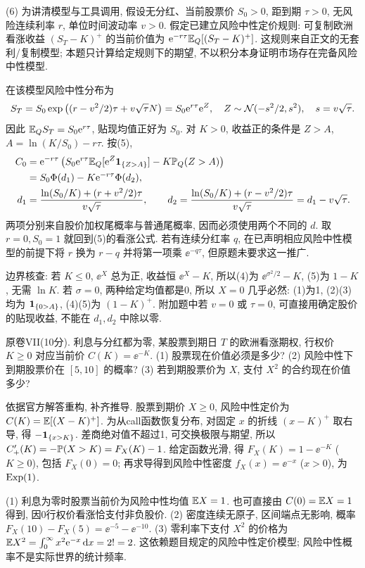 \begin{solution}
(6)\label{sol:flp-VI-6} 为讲清模型与工具调用, 假设无分红、当前股票价 $S_0>0$, 距到期 $\tau>0$, 无风险连续利率 $r$, 单位时间波动率 $v>0$. 假定已建立风险中性定价规则: 可复制欧洲看涨收益 $(S_T-K)^+$ 的当前价值为 $\mathrm e^{-r\tau}\mathbb E_Q[(S_T-K)^+]$. 这规则来自正文的无套利/复制模型; 本题只计算给定规则下的期望, 不以积分本身证明市场存在完备风险中性模型.

在该模型风险中性分布为
\[S_T=S_0\exp\left((r-v^2/2)\tau+v\sqrt\tau N\right)
=S_0\mathrm e^{r\tau}\mathrm e^Z,\quad
Z\sim\mathcal N(-s^2/2,s^2),\quad s=v\sqrt\tau.\]
因此 $\mathbb E_Q S_T=S_0\mathrm e^{r\tau}$, 贴现均值正好为 $S_0$. 对 $K>0$, 收益正的条件是 $Z>A$, $A=\ln(K/S_0)-r\tau$. 按(5),
\begin{align*}
C_0&=\mathrm e^{-r\tau}\left(S_0\mathrm e^{r\tau}\mathbb E_Q[\mathrm e^Z\mathbf 1_{\{Z>A\}}]
-K\mathbb P_Q(Z>A)\right)\\
&=S_0\Phi(d_1)-K\mathrm e^{-r\tau}\Phi(d_2),\\
d_1&=\frac{\ln(S_0/K)+(r+v^2/2)\tau}{v\sqrt\tau},\qquad
 d_2=\frac{\ln(S_0/K)+(r-v^2/2)\tau}{v\sqrt\tau}=d_1-v\sqrt\tau.
\end{align*}
两项分别来自股价加权尾概率与普通尾概率, 因而必须使用两个不同的 $d$. 取 $r=0,S_0=1$ 就回到(5)的看涨公式. 若有连续分红率 $q$, 在已声明相应风险中性模型的前提下将 $r$ 换为 $r-q$ 并将第一项乘 $\ee^{-q\tau}$, 但原题未要求这一推广.

边界核查: 若 $K\leq0$, $\ee^X$ 总为正, 收益恒 $\ee^X-K$, 所以(4)为 $\ee^{\sigma^2/2}-K$, (5)为 $1-K$, 无需 $\ln K$. 若 $\sigma=0$, 两种给定均值都是0, 所以 $X=0$ 几乎必然: (1)为1, (2)(3)均为 $\mathbf 1_{\{0>A\}}$, (4)(5)为 $(1-K)^+$. 附加题中若 $v=0$ 或 $\tau=0$, 可直接用确定股价的贴现收益, 不能在 $d_1,d_2$ 中除以零.
\end{solution}

\begin{exercise}\label{ex:flp-VII}
原卷VII(10分). 利息与分红都为零, 某股票到期日 $T$ 的欧洲看涨期权, 行权价 $K\geq0$ 对应当前价 $C(K)=\ee^{-K}$. (1) 股票现在价值必须是多少? (2) 风险中性下到期股票价在 $[5,10]$ 的概率? (3) 若到期股票价为 $X$, 支付 $X^2$ 的合约现在价值多少?
\end{exercise}
\begin{solution}
依据官方解答重构, 补齐推导. 股票到期价 $X\geq0$, 风险中性定价为 $C(K)=\mathbb E[(X-K)^+]$. 为从call函数恢复分布, 对固定 $x$ 的折线 $(x-K)^+$ 取右导, 得 $-\mathbf 1_{\{x>K\}}$. 差商绝对值不超过1, 可交换极限与期望, 所以 $C'_+(K)=-\mathbb P(X>K)=F_X(K)-1$. 给定函数光滑, 得 $F_X(K)=1-\ee^{-K}$ ($K\geq0$), 包括 $F_X(0)=0$; 再求导得到风险中性密度 $f_X(x)=\ee^{-x}$ ($x>0$), 为 $\operatorname{Exp}(1)$.

(1)\label{sol:flp-VII-1} 利息为零时股票当前价为风险中性均值 $\mathbb E X=1$. 也可直接由 $C(0)=\mathbb E X=1$ 得到, 因0行权价看涨恰支付非负股价.
(2)\label{sol:flp-VII-2} 密度连续无原子, 区间端点无影响, 概率 $F_X(10)-F_X(5)=\ee^{-5}-\ee^{-10}$.
(3)\label{sol:flp-VII-3} 零利率下支付 $X^2$ 的价格为 $\mathbb E X^2=\int_0^\infty x^2\mathrm e^{-x}\,\mathrm d x=2!=2$. 这依赖题目规定的风险中性定价模型; 风险中性概率不是实际世界的统计频率.
\end{solution}
